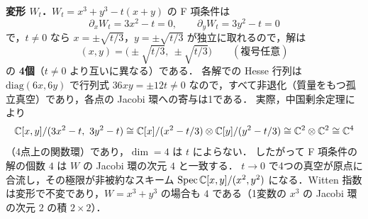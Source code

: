 \textbf{変形 $W_t$．}$W_t=x^3+y^3-t(x+y)$ の F 項条件は
\[
  \partial_xW_t=3x^2-t=0,\qquad \partial_yW_t=3y^2-t=0
\]
で，$t\neq0$ なら $x=\pm\sqrt{t/3}$，$y=\pm\sqrt{t/3}$ が独立に取れるので，解は
\[
  (x,y)=\bigl(\pm\sqrt{t/3},\ \pm\sqrt{t/3}\bigr)\qquad(\text{複号任意})
\]
の \textbf{4個}（$t\neq0$ より互いに異なる）である．
各解での Hesse 行列は $\mathrm{diag}(6x,6y)$ で行列式 $36xy=\pm12t\neq0$ なので，すべて非退化（質量をもつ孤立真空）であり，各点の Jacobi 環への寄与は1である．
実際，中国剰余定理により
\[
  \C[x,y]/(3x^2-t,\ 3y^2-t)\cong\C[x]/(x^2-t/3)\otimes\C[y]/(y^2-t/3)\cong\C^2\otimes\C^2\cong\C^4
\]
（4点上の関数環）であり，$\dim=4$ は $t$ によらない．
したがって F 項条件の解の個数 $4$ は $W$ の Jacobi 環の次元 $4$ と一致する．
$t\to0$ で4つの真空が原点に合流し，その極限が非被約なスキーム $\operatorname{Spec}\mathbb{C}[x,y]/(x^2,y^2)$ になる．Witten 指数は変形で不変であり，$W=x^3+y^3$ の場合も $4$ である（1変数の $x^3$ の Jacobi 環の次元 $2$ の積 $2\times2$）．
